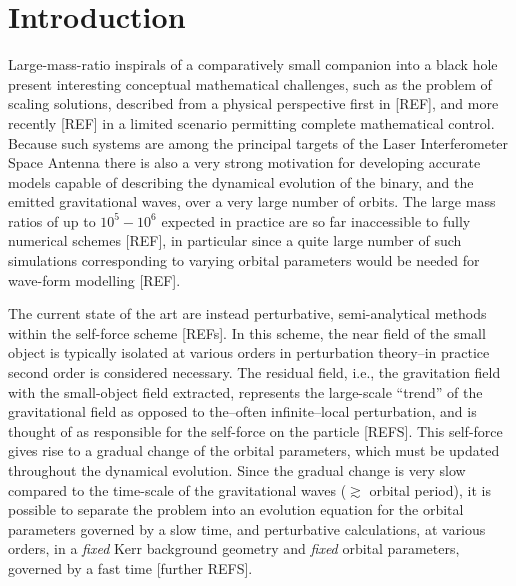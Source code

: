 \documentclass[%
reprint,
 prd,
superscriptaddress,
nofootinbib,
aps,
dvipsnames
]{revtex4-2}
\begin{document}
	\maketitle


\section{Introduction}\label{sec:intro}

Large-mass-ratio inspirals of a comparatively small companion into a black hole present interesting conceptual mathematical challenges, such as the problem of scaling solutions, described from a physical perspective first in [REF], and more recently [REF] in a limited scenario permitting complete mathematical control. Because such systems are among the principal targets of the Laser Interferometer Space Antenna there is also a very strong motivation for developing accurate models capable of describing the dynamical evolution of the binary, and the emitted gravitational waves, over a very large number of orbits. The large mass ratios of up to $10^5-10^6$ expected in practice are so far inaccessible to fully numerical schemes [REF], in particular since a quite large number of such simulations corresponding to varying orbital parameters would be needed for wave-form modelling [REF]. 

The current state of the art are instead perturbative, semi-analytical methods within the self-force scheme [REFs]. In this scheme, the near field of the small object is typically isolated at various orders in perturbation theory--in practice second order is considered necessary. The residual field, i.e., the gravitation field with the small-object field extracted, represents the large-scale ``trend'' of the gravitational field as opposed to the--often infinite--local perturbation, and is thought of as responsible for the self-force on the particle [REFS]. This self-force gives rise to a gradual change of the orbital parameters, which must be updated throughout the dynamical evolution. Since the gradual change is very slow compared to the time-scale of the gravitational waves ($\gtrsim$ orbital period), it is possible to separate the problem into an evolution equation for the orbital parameters governed by a slow time, and perturbative calculations, at various orders, in a {\it fixed} Kerr background geometry and {\it fixed} orbital parameters, governed by a fast time\cite{AmaroSeoane:2012km,Pound:2021qin} [further REFS].
\end{document}
